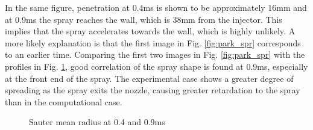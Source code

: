 \documentclass[a4paper,10pt]{article}
\begin{document}
In the same figure, penetration at 0.4ms is shown to be approximately 16mm and at 0.9ms the spray reaches the wall, which is 38mm from the injector. This implies that the spray accelerates towards the wall, which is highly unlikely. A more likely explanation is that the first image in Fig. \ref{fig:park_spr} corresponds to an earlier time. Comparing the first two images in Fig. \ref{fig:park_spr} with the profiles in Fig. \ref{fig:smr_pre1}, good correlation of the spray shape is found at 0.9ms, especially at the front end of the spray. The experimental case shows a greater degree of spreading as the spray exits the nozzle, causing greater retardation to the spray than in the computational case.
\begin{figure}[H]
\centering
{}
\caption{Sauter mean radius at 0.4 and 0.9ms}
\label{fig:smr_pre1}
\end{figure}
\end{document}
